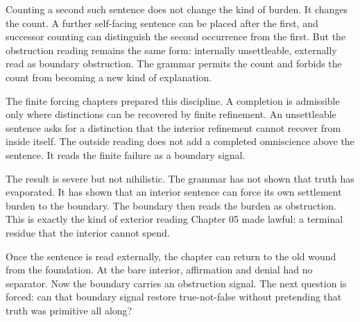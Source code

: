 Counting a second such sentence does not change the kind of burden. It
changes the count. A further self-facing sentence can be placed after the
first, and successor counting can distinguish the second occurrence from the
first. But the obstruction reading remains the same form: internally
unsettleable, externally read as boundary obstruction. The grammar permits
the count and forbids the count from becoming a new kind of explanation.

The finite forcing chapters prepared this discipline. A completion is
admissible only where distinctions can be recovered by finite refinement. An
unsettleable sentence asks for a distinction that the interior refinement
cannot recover from inside itself. The outside reading does not add a
completed omniscience above the sentence. It reads the finite failure as a
boundary signal.

The result is severe but not nihilistic. The grammar has not shown that
truth has evaporated. It has shown that an interior sentence can force its
own settlement burden to the boundary. The boundary then reads the burden as
obstruction. This is exactly the kind of exterior reading Chapter 05 made
lawful: a terminal residue that the interior cannot spend.

Once the sentence is read externally, the chapter can return to the old wound
from the foundation. At the bare interior, affirmation and denial had no
separator. Now the boundary carries an obstruction signal. The next question
is forced: can that boundary signal restore true-not-false without pretending
that truth was primitive all along?
